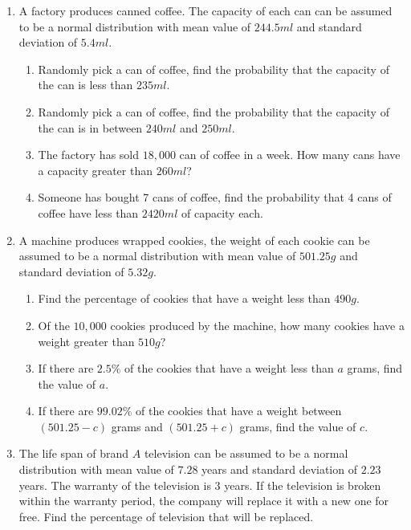 \documentclass{report}
\begin{document}
\begin{multicols}{2}
\begin{enumerate}
    \item A factory produces canned coffee. The capacity of each can can be assumed to be
          a normal distribution with mean value of $244.5ml$ and standard deviation of
          $5.4ml$.
          \begin{enumerate}
            \item Randomly pick a can of coffee, find the probability that the capacity of the
                  can is less than $235ml$.
            \item Randomly pick a can of coffee, find the probability that the capacity of the
                  can is in between $240ml$ and $250ml$.
            \item The factory has sold $18,000$ can of coffee in a week. How many cans have a
                  capacity greater than $260ml$?
            \item Someone has bought 7 cans of coffee, find the probability that 4 cans of coffee
                  have less than $2420ml$ of capacity each.
          \end{enumerate}

    \item A machine produces wrapped cookies, the weight of each cookie can be assumed to
          be a normal distribution with mean value of $501.25g$ and standard deviation of
          $5.32g$.
          \begin{enumerate}
            \item Find the percentage of cookies that have a weight less than $490g$.
            \item Of the $10,000$ cookies produced by the machine, how many cookies have a weight
                  greater than $510g$?
            \item If there are $2.5\%$ of the cookies that have a weight less than $a$ grams,
                  find the value of $a$.
            \item If there are $99.02\%$ of the cookies that have a weight between $(501.25 - c)$
                  grams and $(501.25 + c)$ grams, find the value of $c$.
          \end{enumerate}

    \item The life span of brand $A$ television can be assumed to be a normal
          distribution with mean value of $7.28$ years and standard deviation of $2.23$
          years. The warranty of the television is $3$ years. If the television is broken
          within the warranty period, the company will replace it with a new one for
          free. Find the percentage of television that will be replaced.


\end{enumerate}
\end{multicols}
\end{document}
